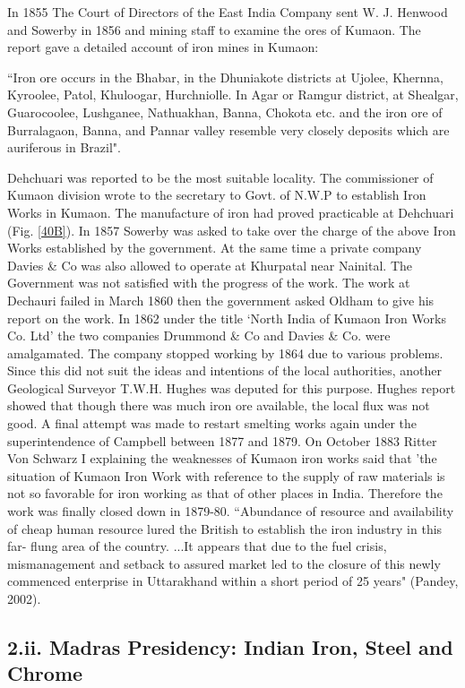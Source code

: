 In 1855 The Court of Directors of the East India Company sent W. J. Henwood and Sowerby in 1856 and mining staff to examine the ores of Kumaon. The report gave a detailed account of iron mines in Kumaon:

``Iron ore occurs in the Bhabar, in the Dhuniakote districts at Ujolee, Khernna, Kyroolee, Patol, Khuloogar, Hurchniolle. In Agar or Ramgur district, at Shealgar, Guarocoolee, Lushganee, Nathuakhan, Banna, Chokota etc. and the iron ore of Burralagaon, Banna, and Pannar valley resemble very closely deposits which are auriferous in Brazil".

Dehchuari was reported to be the most suitable locality. The commissioner of Kumaon division wrote to the secretary to Govt. of N.W.P to establish Iron Works in Kumaon. The manufacture of iron had proved practicable at Dehchuari (Fig. \ref{40B}). In 1857 Sowerby was asked to take over the charge of the above Iron Works established by the government. At the same time a private company Davies \& Co was also allowed to operate at Khurpatal near Nainital. The Government was not satisfied with the progress of the work. The work at Dechauri failed in March 1860 then the government asked Oldham to give his report on the work. In 1862 under the title `North India of Kumaon Iron Works Co. Ltd' the two companies Drummond \& Co and Davies \& Co. were amalgamated. The company stopped working by 1864 due to various problems. Since this did not suit the ideas and intentions of the local authorities, another Geological Surveyor T.W.H. Hughes was deputed for this purpose. Hughes report showed that though there was much iron ore available, the local flux was not good. A final attempt was made to restart smelting works again under the superintendence of Campbell between 1877 and 1879. On October 1883 Ritter Von Schwarz I explaining the weaknesses of Kumaon iron works said that 'the situation of Kumaon Iron Work with reference to the supply of raw materials is not so favorable for iron working as that of other places in India. Therefore the work was finally closed down in 1879-80. ``Abundance of resource and availability of cheap human resource lured the British to establish the iron industry in this far- flung area of the country. ...It appears that due to the fuel crisis, mismanagement and setback to assured market led to the closure of this newly commenced enterprise in Uttarakhand within a short period of 25 years" (Pandey, 2002).

\subsection*{2.ii.  Madras Presidency: Indian Iron, Steel and Chrome}

